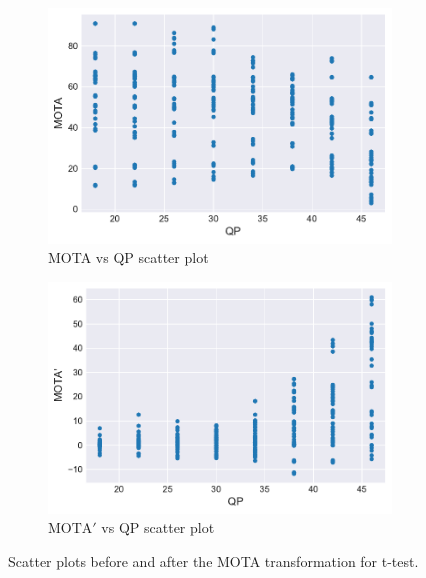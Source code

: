 \begin{figure}[!tb]
  \centering
  \begin{subfigure}{.5\linewidth}
    \centering
    \includegraphics[width=\linewidth]{img/score_transformation_before.pdf}
    \caption{MOTA vs QP scatter plot}
    \label{fig:score_transformation_before}
  \end{subfigure}%
  \begin{subfigure}{.5\linewidth}
    \centering
    \includegraphics[width=\linewidth]{img/score_transformation_after.pdf}
    \caption{$\text{MOTA}'$ vs QP scatter plot }
    \label{fig:score_transformation_after}
  \end{subfigure}
  \caption[Scatter plots before and after the MOTA transformation for t-test]{%
    Scatter plots before and after the MOTA transformation for t-test.%
  }
  \label{fig:score_transformation}
\end{figure}
